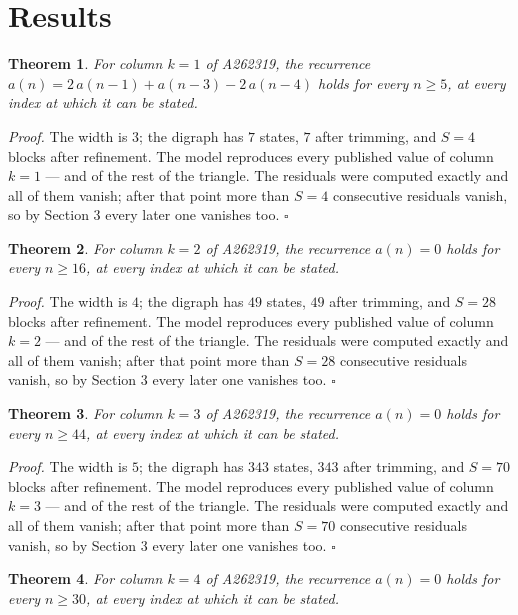 \documentclass[11pt]{article}
\newtheorem{theorem}{Theorem}
\theoremstyle{definition}
\begin{document}
\section{Results}

\begin{theorem} For column $k = 1$ of A262319, the recurrence $a(n) = 2\,a(n-1) + a(n-3) - 2\,a(n-4)$ holds for every $n \ge 5$, at every index at which it can be stated.\end{theorem}

{\itshape Proof.} The width is $3$; the digraph has $7$ states, $7$ after trimming, and $S = 4$ blocks after refinement. The model reproduces every published value of column $k = 1$ --- and of the rest of the triangle. The residuals were computed exactly and all of them vanish; after that point more than $S = 4$ consecutive residuals vanish, so by Section 3 every later one vanishes too. $\square$

\begin{theorem} For column $k = 2$ of A262319, the recurrence $a(n) = 0$ holds for every $n \ge 16$, at every index at which it can be stated.\end{theorem}

{\itshape Proof.} The width is $4$; the digraph has $49$ states, $49$ after trimming, and $S = 28$ blocks after refinement. The model reproduces every published value of column $k = 2$ --- and of the rest of the triangle. The residuals were computed exactly and all of them vanish; after that point more than $S = 28$ consecutive residuals vanish, so by Section 3 every later one vanishes too. $\square$

\begin{theorem} For column $k = 3$ of A262319, the recurrence $a(n) = 0$ holds for every $n \ge 44$, at every index at which it can be stated.\end{theorem}

{\itshape Proof.} The width is $5$; the digraph has $343$ states, $343$ after trimming, and $S = 70$ blocks after refinement. The model reproduces every published value of column $k = 3$ --- and of the rest of the triangle. The residuals were computed exactly and all of them vanish; after that point more than $S = 70$ consecutive residuals vanish, so by Section 3 every later one vanishes too. $\square$

\begin{theorem} For column $k = 4$ of A262319, the recurrence $a(n) = 0$ holds for every $n \ge 30$, at every index at which it can be stated.\end{theorem}
\end{document}
